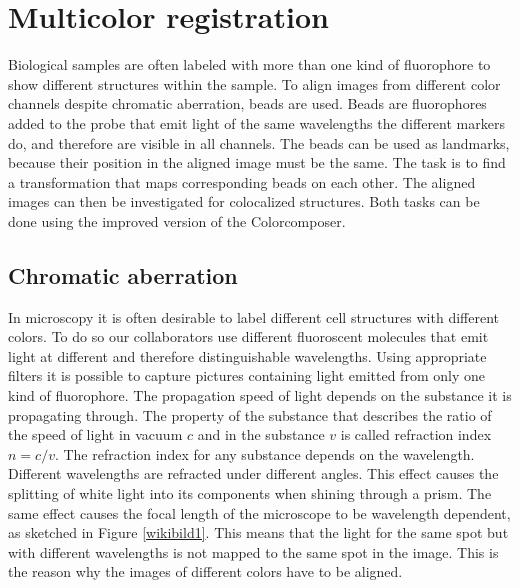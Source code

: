 \chapter{Multicolor registration}
Biological samples are often labeled with more than one kind of fluorophore to show different structures within the sample. To align images from
different color channels despite chromatic aberration, beads are used. Beads are
fluorophores added to the probe that emit light of the same wavelengths the
different markers do, and therefore are visible in all channels. The beads can be
used as landmarks, because their position in the aligned image must be the same. The task is to find a transformation that maps corresponding beads on each
other.\newline
The aligned images can then be investigated for colocalized structures.\newline
Both tasks can be done using the improved version of the Colorcomposer.

\section{Chromatic aberration}
In microscopy it is often desirable to label different cell structures with
different colors. To do so our collaborators use different fluoroscent molecules
that emit light at different and therefore distinguishable wavelengths. Using appropriate
filters it is possible to capture pictures containing light emitted from only one
kind of fluorophore.\newline
The propagation speed of light depends on the substance it is propagating through. The property of the substance that describes the ratio of the speed of light in vacuum $c$ and in the substance $v$ is called refraction index $n = c/v$.\newline
The refraction index for any substance depends on the wavelength. Different wavelengths are refracted under different angles. This effect causes the splitting of white light into its components when shining through a prism.\newline
The same effect causes the focal length of the microscope to be wavelength dependent, as sketched in  Figure \ref{wikibild1}. This means that the light for the same spot but with
different wavelengths is not mapped to the same spot in the image. This is the reason why the images of different colors have to be aligned.

